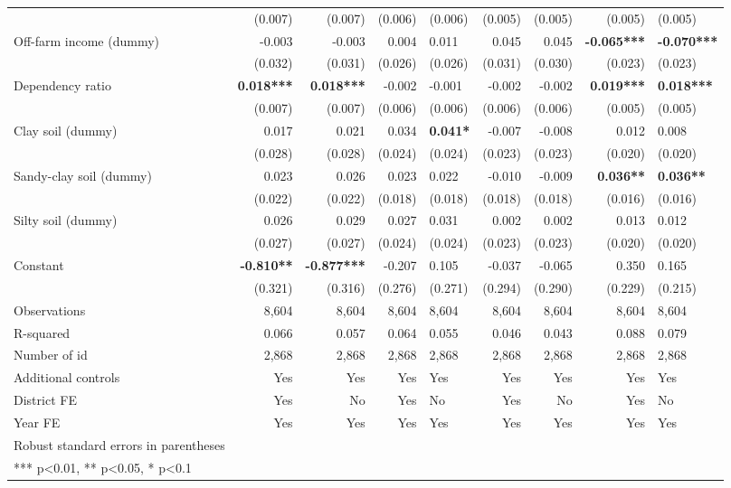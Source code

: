 \documentclass[
]{article}
\begin{document}
\begin{landscape}
\begin{longtable}[t]{lrrrlrrrl}
\addlinespace
 & (0.007) & (0.007) & (0.006) & (0.006) & (0.005) & (0.005) & (0.005) & (0.005)\\
Off-farm income (dummy) & -0.003 & -0.003 & 0.004 & 0.011 & 0.045 & 0.045 & \textbf{-0.065***} & \textbf{-0.070***}\\
 & (0.032) & (0.031) & (0.026) & (0.026) & (0.031) & (0.030) & (0.023) & (0.023)\\
Dependency ratio & \textbf{0.018***} & \textbf{0.018***} & -0.002 & -0.001 & -0.002 & -0.002 & \textbf{0.019***} & \textbf{0.018***}\\
 & (0.007) & (0.007) & (0.006) & (0.006) & (0.006) & (0.006) & (0.005) & (0.005)\\
\addlinespace
Clay soil (dummy) & 0.017 & 0.021 & 0.034 & \textbf{0.041*} & -0.007 & -0.008 & 0.012 & 0.008\\
 & (0.028) & (0.028) & (0.024) & (0.024) & (0.023) & (0.023) & (0.020) & (0.020)\\
Sandy-clay soil (dummy) & 0.023 & 0.026 & 0.023 & 0.022 & -0.010 & -0.009 & \textbf{0.036**} & \textbf{0.036**}\\
 & (0.022) & (0.022) & (0.018) & (0.018) & (0.018) & (0.018) & (0.016) & (0.016)\\
Silty soil (dummy) & 0.026 & 0.029 & 0.027 & 0.031 & 0.002 & 0.002 & 0.013 & 0.012\\
\addlinespace
 & (0.027) & (0.027) & (0.024) & (0.024) & (0.023) & (0.023) & (0.020) & (0.020)\\
Constant & \textbf{-0.810**} & \textbf{-0.877***} & -0.207 & 0.105 & -0.037 & -0.065 & 0.350 & 0.165\\
\midrule
 & (0.321) & (0.316) & (0.276) & (0.271) & (0.294) & (0.290) & (0.229) & (0.215)\\
Observations & 8,604 & 8,604 & 8,604 & 8,604 & 8,604 & 8,604 & 8,604 & 8,604\\
R-squared & 0.066 & 0.057 & 0.064 & 0.055 & 0.046 & 0.043 & 0.088 & 0.079\\
\addlinespace
Number of id & 2,868 & 2,868 & 2,868 & 2,868 & 2,868 & 2,868 & 2,868 & 2,868\\
Additional controls & Yes & Yes & Yes & Yes & Yes & Yes & Yes & Yes\\
District FE & Yes & No & Yes & No & Yes & No & Yes & No\\
Year FE & Yes & Yes & Yes & Yes & Yes & Yes & Yes & Yes\\
\midrule
Robust standard errors in parentheses &  &  &  &  &  &  &  & \\
\addlinespace
*** p<0.01, ** p<0.05, * p<0.1 &  &  &  &  &  &  &  & \\*
\end{longtable}
\end{landscape}
\endgroup{}
\end{document}
